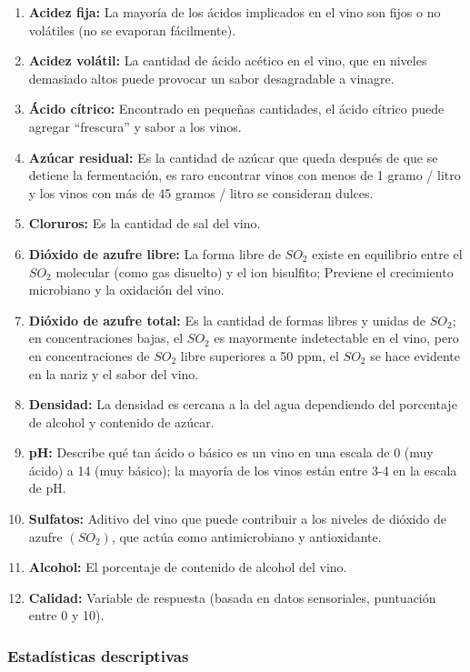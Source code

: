 \documentclass[
]{article}
\begin{document}
\begin{enumerate}
\def\labelenumi{\arabic{enumi}.}
\item
  \textbf{Acidez fija:} La mayoría de los ácidos implicados en el vino
  son fijos o no volátiles (no se evaporan fácilmente).
\item
  \textbf{Acidez volátil:} La cantidad de ácido acético en el vino, que
  en niveles demasiado altos puede provocar un sabor desagradable a
  vinagre.
\item
  \textbf{Ácido cítrico:} Encontrado en pequeñas cantidades, el ácido
  cítrico puede agregar ``frescura'' y sabor a los vinos.
\item
  \textbf{Azúcar residual:} Es la cantidad de azúcar que queda después
  de que se detiene la fermentación, es raro encontrar vinos con menos
  de 1 gramo / litro y los vinos con más de 45 gramos / litro se
  consideran dulces.
\item
  \textbf{Cloruros:} Es la cantidad de sal del vino.
\item
  \textbf{Dióxido de azufre libre:} La forma libre de \(SO_{2}\) existe
  en equilibrio entre el \(SO_{2}\) molecular (como gas disuelto) y el
  ion bisulfito; Previene el crecimiento microbiano y la oxidación del
  vino.
\item
  \textbf{Dióxido de azufre total:} Es la cantidad de formas libres y
  unidas de \(SO_{2}\); en concentraciones bajas, el \(SO_{2}\) es
  mayormente indetectable en el vino, pero en concentraciones de
  \(SO_{2}\) libre superiores a 50 ppm, el \(SO_{2}\) se hace evidente
  en la nariz y el sabor del vino.
\item
  \textbf{Densidad:} La densidad es cercana a la del agua dependiendo
  del porcentaje de alcohol y contenido de azúcar.
\item
  \textbf{pH:} Describe qué tan ácido o básico es un vino en una escala
  de 0 (muy ácido) a 14 (muy básico); la mayoría de los vinos están
  entre 3-4 en la escala de pH.
\item
  \textbf{Sulfatos:} Aditivo del vino que puede contribuir a los niveles
  de dióxido de azufre \((SO_{2})\), que actúa como antimicrobiano y
  antioxidante.
\item
  \textbf{Alcohol:} El porcentaje de contenido de alcohol del vino.
\item
  \textbf{Calidad:} Variable de respuesta (basada en datos sensoriales,
  puntuación entre 0 y 10).
\end{enumerate}

\hypertarget{estaduxedsticas-descriptivas}{%
\subsubsection{Estadísticas
descriptivas}\label{estaduxedsticas-descriptivas}}
\end{document}
